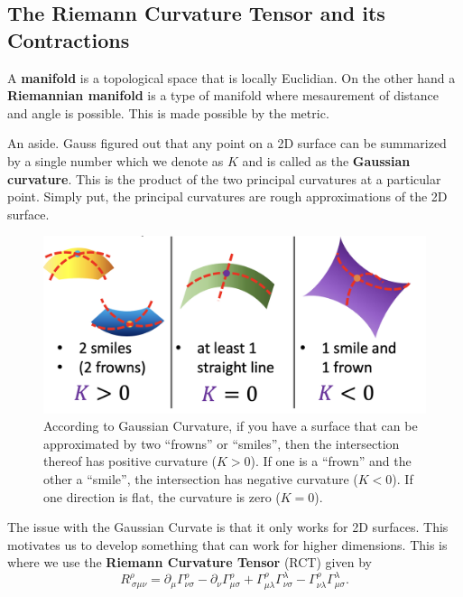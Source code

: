 \documentclass[a4paper,11pt]{article}
\begin{document}
\subsection{The Riemann Curvature Tensor and its Contractions}
\label{subsec:RCT}
 A \textbf{manifold} is a topological space that is locally Euclidian. On the other hand a \textbf{Riemannian manifold} is a type of 
 manifold where mesaurement of distance and angle is possible. This is made possible by the metric. 

 An aside. Gauss figured out that any point on a 2D surface can be summarized by a single number which
 we denote as $K$ and is called as the \textbf{Gaussian curvature}. This is the product of the two principal curvatures
 at a particular point. Simply put, the principal curvatures are rough approximations of the 2D surface.
\begin{figure}[H]
\centering
\def\imgwidth{0.65\linewidth}
\includegraphics[width=\imgwidth]{pasted-images/primordial-cosmological-perturbations-00-21-20.png}
\caption{According to Gaussian Curvature, if you have a surface that can be approximated
by two “frowns” or “smiles”, then the intersection thereof has positive curvature ($K>0$).
If one is a “frown” and the other a “smile”, the intersection has negative curvature ($K<0$).
If one direction is flat, the curvature is zero ($K=0$).}
\label{fig:gaussian-curvature}
\end{figure}
The issue with the Gaussian Curvate is that it only works for 2D surfaces. This motivates
us to develop something that can work for higher dimensions. This is where we use the \textbf{Riemann Curvature Tensor} (RCT) given by
\begin{equation}
    R^\rho_{\ \sigma\mu\nu} = \partial_\mu \Gamma^\rho_{\nu\sigma} - \partial_\nu \Gamma^\rho_{\mu\sigma} + \Gamma^\rho_{\mu\lambda} \Gamma^\lambda_{\nu\sigma} - \Gamma^\rho_{\nu\lambda} \Gamma^\lambda_{\mu\sigma}.
    \label{riemann-curvature-tensor}
\end{equation}
\end{document}
